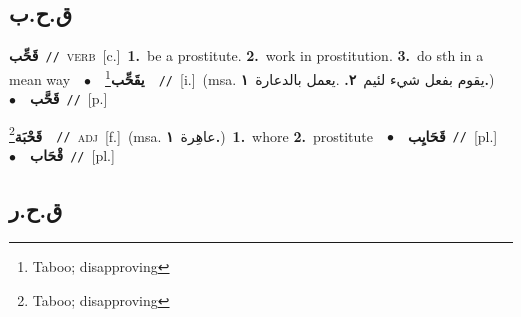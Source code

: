 \documentclass[10pt,a4paper,twoside]{article} %
\begin{document}
\begin{multicols}{2}
{{{{{{{{{{{{{{{{\vspace{-3mm}
\subsection*{\color{blue}\foreignlanguage{arabic}{ق.ح.ب}\color{blue}{}} 

{\setlength\topsep{0pt}\textbf{\foreignlanguage{arabic}{قَحِّب}}\ {\color{gray}\texttt{//}\color{black}}\ \textsc{verb}\ [c.]\ \textbf{1.}~be a prostitute.  \textbf{2.}~work in prostitution.  \textbf{3.}~do sth in a mean way\ \ $\bullet$\ \ \setlength\topsep{0pt}\textbf{\foreignlanguage{arabic}{يقَحِّب}}\footnote{Taboo; disapproving}\ \ {\color{gray}\texttt{//}\color{black}}\ [i.]\ \color{gray}(msa. \foreignlanguage{arabic}{يقوم بفعل شيء لئيم}~\foreignlanguage{arabic}{\textbf{٢.}}  .\foreignlanguage{arabic}{يعمل بالدعارة}~\foreignlanguage{arabic}{\textbf{١.}})\color{black}\ \ $\bullet$\ \ \setlength\topsep{0pt}\textbf{\foreignlanguage{arabic}{قَحَّب}}\ {\color{gray}\texttt{//}\color{black}}\ [p.]\ 

{\setlength\topsep{0pt}\textbf{\foreignlanguage{arabic}{قَحْبَة}}\footnote{Taboo; disapproving}\ \ {\color{gray}\texttt{//}\color{black}}\ \textsc{adj}\ [f.]\ \color{gray}(msa. \foreignlanguage{arabic}{عاهِرة}~\foreignlanguage{arabic}{\textbf{١.}})\color{black}\ \textbf{1.}~whore  \textbf{2.}~prostitute\ \ $\bullet$\ \ \setlength\topsep{0pt}\textbf{\foreignlanguage{arabic}{قَحَايِب}}\ {\color{gray}\texttt{//}\color{black}}\ [pl.]\ \ $\bullet$\ \ \setlength\topsep{0pt}\textbf{\foreignlanguage{arabic}{قْحَاب}}\ {\color{gray}\texttt{//}\color{black}}\ [pl.]\ 

\vspace{-3mm}
\subsection*{\color{blue}\foreignlanguage{arabic}{ق.ح.ر}\color{blue}{}} 

}}}}}}}}}}}}}}}}}}
\end{multicols}
\end{document}
